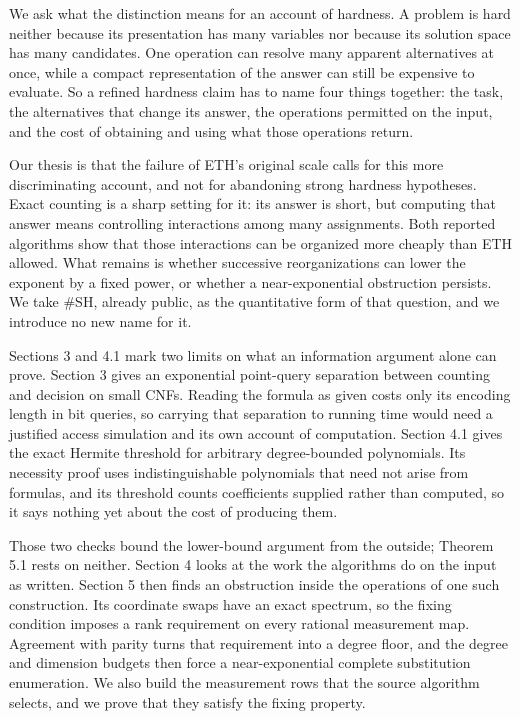 \documentclass[11pt,letterpaper]{article}
\begin{document}
We ask what the distinction means for an account of hardness. A problem
is hard neither because its presentation has many variables nor because
its solution space has many candidates. One operation can resolve many
apparent alternatives at once, while a compact representation of the
answer can still be expensive to evaluate. So a refined hardness claim
has to name four things together: the task, the alternatives that change
its answer, the operations permitted on the input, and the cost of
obtaining and using what those operations return.

Our thesis is that the failure of ETH's original scale calls for this
more discriminating account, and not for abandoning strong hardness
hypotheses. Exact counting is a sharp setting for it: its answer is
short, but computing that answer means controlling interactions among
many assignments. Both reported algorithms show that those interactions
can be organized more cheaply than ETH allowed. What remains is whether
successive reorganizations can lower the exponent by a fixed power, or
whether a near-exponential obstruction persists. We take \#SH, already
public, as the quantitative form of that question, and we introduce no
new name for it.

Sections 3 and 4.1 mark two limits on what an information argument alone
can prove. Section 3 gives an exponential point-query separation between
counting and decision on small CNFs. Reading the formula as given costs
only its encoding length in bit queries, so carrying that separation to
running time would need a justified access simulation and its own
account of computation. Section 4.1 gives the exact Hermite threshold
for arbitrary degree-bounded polynomials. Its necessity proof uses
indistinguishable polynomials that need not arise from formulas, and its
threshold counts coefficients supplied rather than computed, so it says
nothing yet about the cost of producing them.

Those two checks bound the lower-bound argument from the outside;
Theorem 5.1 rests on neither. Section 4 looks at the work the algorithms
do on the input as written. Section 5 then finds an obstruction inside
the operations of one such construction. Its coordinate swaps have an
exact spectrum, so the fixing condition imposes a rank requirement on
every rational measurement map. Agreement with parity turns that
requirement into a degree floor, and the degree and dimension budgets
then force a near-exponential complete substitution enumeration. We also
build the measurement rows that the source algorithm selects, and we
prove that they satisfy the fixing property.
\end{document}
